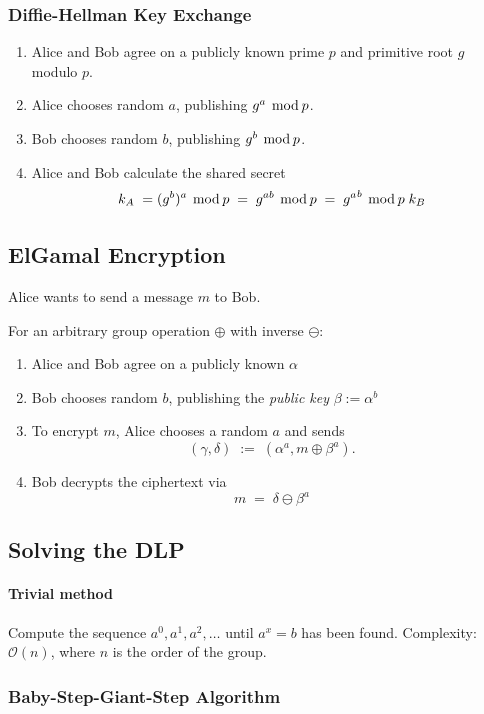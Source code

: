 \documentclass[a4paper]{scrartcl}
\newcommand\bigO{\mathcal O}
\renewcommand\mod{\hspace*{0.4em}\mathrm{mod}\hspace*{0.2em}}
\begin{document}
\subsubsection{Diffie-Hellman Key Exchange}

\begin{enumerate}
    \item Alice and Bob agree on a publicly known prime $p$ and primitive root $g$ modulo $p$.
    \item Alice chooses random $a$, publishing $g^a\mod p$.
    \item Bob chooses random $b$, publishing $g^b\mod p$.
    \item Alice and Bob calculate the shared secret\[k_A\;=(g^b)^a\mod p\;=\;g^{ab}\mod p\;=\;{g^a}^b\mod p\;k_B\]
\end{enumerate}


\subsection{ElGamal Encryption}

Alice wants to send a message $m$ to Bob.

For an arbitrary group operation $\oplus$ with inverse $\ominus$:

\begin{enumerate}
    \item Alice and Bob agree on a publicly known $\alpha$
    \item Bob chooses random $b$, publishing the \textit{public key} $\beta:=\alpha^b$
    \item To encrypt $m$, Alice chooses a random $a$ and sends \[(\gamma,\delta)\;:=\;(\alpha^a,m\oplus\beta^a).\]
    \item Bob decrypts the ciphertext via \[m\;=\;\delta\ominus\beta^a\]
\end{enumerate}

\subsection{Solving the DLP}

\paragraph{Trivial method} Compute the sequence $a^0,a^1,a^2,\hdots$ until $a^x=b$ has been found. Complexity: $\bigO(n)$, where $n$ is the order of the group.

\subsubsection{Baby-Step-Giant-Step Algorithm}
\end{document}
